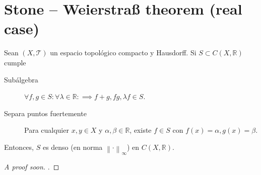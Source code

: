 \section{Stone – Weierstraß theorem (real case)}

\begin{frame}

	\begin{theorem}[\secname]
		Sean $\left(X, \mathcal{T}\right)$ un espacio topológico
		compacto y Hausdorff.
		Si $S\subset C\left(X,\mathds{R}\right)$ cumple
		\begin{description}
			\item[Subálgebra]

				\begin{math}
					\forall f,g\in S:
					\forall\lambda\in\mathds{R}:
					\implies f+g,fg,\lambda f\in S
				\end{math}.

			\item[Separa puntos fuertemente]

				Para cualquier
				$x,y\in X$ y $\alpha,\beta\in\mathds{R}$, existe $f\in S$
				con $f\left(x\right)=\alpha, g\left(x\right)=\beta$.
		\end{description}
		Entonces, $S$ es denso (en norma $\left\|\cdot\right\|_{\infty}$)
		en $C\left(X,\mathds{R}\right)$.
	\end{theorem}

	\begin{proof}[\alert{A proof soon}]
		.
	\end{proof}
\end{frame}